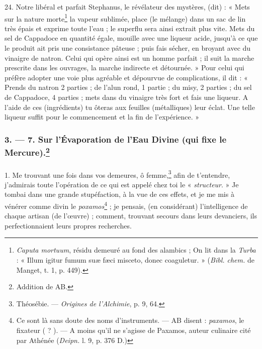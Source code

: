 \documentclass[a4paper, 11pt, oneside, polutonikogreek, french]{article}
\begin{document}
24. Notre libéral et parfait Stephanus, le révélateur des mystères, (dit) : « Mets sur la nature morte\footnote{\emph{Caputa mortuum}, résidu demeuré au fond des alambics ; On lit dans la \emph{Turba} : « Illum igitur fumum suæ fæci misceto, donec coaguletur. » (\emph{Bibl. chem.} de Manget, t. 1, p. 449).} la vapeur sublimée, place (le mélange) dans un sac de lin très épais et exprime toute l'eau ; le superflu sera ainsi extrait plus vite. Mets du sel de Cappadoce en quantité égale, mouille avec une liqueur acide, jusqu'à ce que le produit ait pris une consistance pâteuse ; puis fais sécher, en broyant avec du vinaigre de natron. Celui qui opère ainsi est un homme parfait ; il suit la marche prescrite dans les ouvrages, la marche indirecte et détournée. » Pour celui qui préfère adopter une voie plus agréable et dépourvue de complications, il dit : « Prends du natron 2 parties ; de l'alun rond, 1 partie ; du misy, 2 parties ; du sel de Cappadoce, 4 parties ; mets dans du vinaigre très fort et fais une liqueur. A l'aide de ces (ingrédients) tu ôteras aux feuilles (métalliques) leur éclat. Une telle liqueur suffit pour le commencement et la fin de l'expérience. »

\bigskip
\centerline{\EightStarTaper}
\centerline{\EightStarTaper\EightStarTaper}
\bigskip

\subsubsection[3. --- 7. Sur l'Évaporation de l'Eau Divine (qui fixe le Mercure).]{3. --- 7. Sur l'Évaporation de l'Eau Divine (qui fixe le Mercure).\footnote{Addition de AB.}}
\paragraph{}
1. Me trouvant une fois dans vos demeures, ô femme,\footnote{Théosébie. --- \emph{Origines de l'Alchimie}, p. 9, 64.} afin de t'entendre, j'admirais toute l'opération de ce qui est appelé chez toi le « \emph{structeur}. » Je tombai dans une grande stupéfaction, à la vue de ces effets, et je me mis à vénérer comme divin le \emph{poxamos}\footnote{Ce sont là sans doute des noms d'instruments. --- AB disent : \emph{paxamos}, le fixateur ( ? ). --- A moins qu'il ne s'agisse de Paxamos, auteur culinaire cité par Athénée (\emph{Deipn.} l. 9, p. 376 D.)} ; je pensais, (en considérant) l'intelligence de chaque artisan (de l'œuvre) ; comment, trouvant secours dans leurs devanciers, ils perfectionnaient leurs propres recherches.
\end{document}
